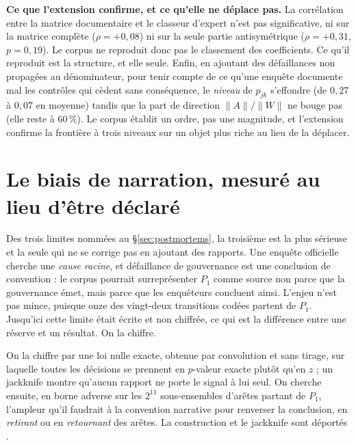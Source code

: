 \begin{cle}
\textbf{Ce que l'extension confirme, et ce qu'elle ne déplace pas.} La corrélation entre la
matrice documentaire et le classeur d'expert n'est pas significative, ni sur la matrice
complète ($\rho=+0{,}08$) ni sur la seule partie antisymétrique ($\rho=+0{,}31$, $p=0{,}19$).
Le corpus ne reproduit donc pas le classement des coefficients. Ce qu'il reproduit est la structure, et elle seule. Enfin, en
ajoutant des défaillances non propagées au dénominateur, pour tenir compte de ce qu'une enquête
documente mal les contrôles qui cèdent sans conséquence, le \emph{niveau} de $p_{jk}$ s'effondre
(de $0{,}27$ à $0{,}07$ en moyenne) tandis que la part de direction
$\lVert A\rVert/\lVert W\rVert$ ne bouge pas (elle reste à $60\,\%$). Le corpus établit un
ordre, pas une magnitude, et l'extension confirme la frontière à trois niveaux sur un
objet plus riche au lieu de la déplacer.
\end{cle}


\section{Le biais de narration, mesuré au lieu d'être déclaré}
\label{sec:biais-narration}

Des trois limites nommées au \S\ref{sec:postmortems}, la troisième est la plus sérieuse et la
seule qui ne se corrige pas en ajoutant des rapports. Une enquête officielle cherche une
\emph{cause racine}, et \og défaillance de gouvernance\fg{} est une conclusion de convention : le
corpus pourrait surreprésenter $P_1$ comme source non parce que la gouvernance émet, mais parce
que les enquêteurs concluent ainsi. L'enjeu n'est pas mince, puisque onze des vingt-deux
transitions codées partent de $P_1$. Jusqu'ici cette limite était écrite et non chiffrée, ce
qui est la différence entre une réserve et un résultat. On la chiffre.

On la chiffre par une loi nulle exacte, obtenue par convolution et sans tirage, sur laquelle
toutes les décisions se prennent en $p$-valeur exacte plutôt qu'en $z$ ; un jackknife montre
qu'aucun rapport ne porte le signal à lui seul. On cherche ensuite, en borne adverse sur les
$2^{11}$ sous-ensembles d'arêtes partant de $P_1$, l'ampleur qu'il faudrait à la convention
narrative pour renverser la conclusion, en \emph{retirant} ou en \emph{retournant} des arêtes.
La construction et le jackknife sont déportés \matcomp.

